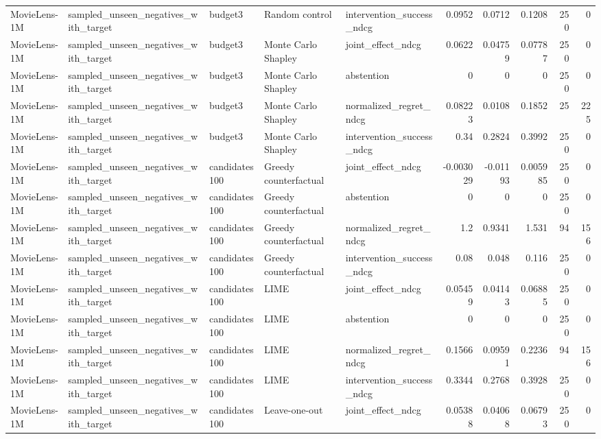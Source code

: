 \begin{table}[t]
{\begin{tabular}{lllllrrrrr}
MovieLens-1M & sampled\_unseen\_negatives\_with\_target & budget3 & Random control & intervention\_success\_ndcg & 0.0952 & 0.0712 & 0.1208 & 250 & 0 \\
MovieLens-1M & sampled\_unseen\_negatives\_with\_target & budget3 & Monte Carlo Shapley & joint\_effect\_ndcg & 0.0622 & 0.04759 & 0.07787 & 250 & 0 \\
MovieLens-1M & sampled\_unseen\_negatives\_with\_target & budget3 & Monte Carlo Shapley & abstention & 0 & 0 & 0 & 250 & 0 \\
MovieLens-1M & sampled\_unseen\_negatives\_with\_target & budget3 & Monte Carlo Shapley & normalized\_regret\_ndcg & 0.08223 & 0.0108 & 0.1852 & 25 & 225 \\
MovieLens-1M & sampled\_unseen\_negatives\_with\_target & budget3 & Monte Carlo Shapley & intervention\_success\_ndcg & 0.34 & 0.2824 & 0.3992 & 250 & 0 \\
MovieLens-1M & sampled\_unseen\_negatives\_with\_target & candidates100 & Greedy counterfactual & joint\_effect\_ndcg & -0.003029 & -0.01193 & 0.005985 & 250 & 0 \\
MovieLens-1M & sampled\_unseen\_negatives\_with\_target & candidates100 & Greedy counterfactual & abstention & 0 & 0 & 0 & 250 & 0 \\
MovieLens-1M & sampled\_unseen\_negatives\_with\_target & candidates100 & Greedy counterfactual & normalized\_regret\_ndcg & 1.2 & 0.9341 & 1.531 & 94 & 156 \\
MovieLens-1M & sampled\_unseen\_negatives\_with\_target & candidates100 & Greedy counterfactual & intervention\_success\_ndcg & 0.08 & 0.048 & 0.116 & 250 & 0 \\
MovieLens-1M & sampled\_unseen\_negatives\_with\_target & candidates100 & LIME & joint\_effect\_ndcg & 0.05459 & 0.04143 & 0.06885 & 250 & 0 \\
MovieLens-1M & sampled\_unseen\_negatives\_with\_target & candidates100 & LIME & abstention & 0 & 0 & 0 & 250 & 0 \\
MovieLens-1M & sampled\_unseen\_negatives\_with\_target & candidates100 & LIME & normalized\_regret\_ndcg & 0.1566 & 0.09591 & 0.2236 & 94 & 156 \\
MovieLens-1M & sampled\_unseen\_negatives\_with\_target & candidates100 & LIME & intervention\_success\_ndcg & 0.3344 & 0.2768 & 0.3928 & 250 & 0 \\
MovieLens-1M & sampled\_unseen\_negatives\_with\_target & candidates100 & Leave-one-out & joint\_effect\_ndcg & 0.05388 & 0.04068 & 0.06793 & 250 & 0 \\

\end{tabular}}
\end{table}
